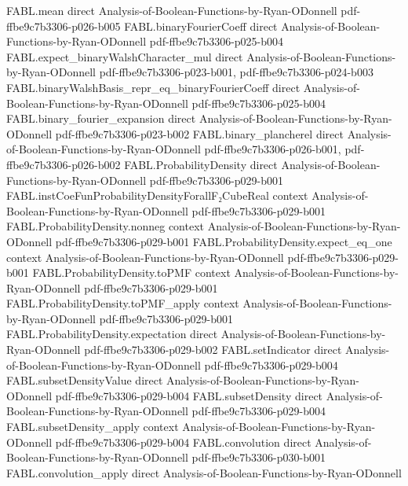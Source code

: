 \begin{theorem}
\proofstep
  {FABL.mean}
  {direct}
  {Analysis-of-Boolean-Functions-by-Ryan-ODonnell}
  {pdf-ffbe9c7b3306-p026-b005}
\proofstep
  {FABL.binaryFourierCoeff}
  {direct}
  {Analysis-of-Boolean-Functions-by-Ryan-ODonnell}
  {pdf-ffbe9c7b3306-p025-b004}
\proofstep
  {FABL.expect_binaryWalshCharacter_mul}
  {direct}
  {Analysis-of-Boolean-Functions-by-Ryan-ODonnell}
  {pdf-ffbe9c7b3306-p023-b001,
    pdf-ffbe9c7b3306-p024-b003}
\proofstep
  {FABL.binaryWalshBasis_repr_eq_binaryFourierCoeff}
  {direct}
  {Analysis-of-Boolean-Functions-by-Ryan-ODonnell}
  {pdf-ffbe9c7b3306-p025-b004}
\proofstep
  {FABL.binary_fourier_expansion}
  {direct}
  {Analysis-of-Boolean-Functions-by-Ryan-ODonnell}
  {pdf-ffbe9c7b3306-p023-b002}
\proofstep
  {FABL.binary_plancherel}
  {direct}
  {Analysis-of-Boolean-Functions-by-Ryan-ODonnell}
  {pdf-ffbe9c7b3306-p026-b001,
    pdf-ffbe9c7b3306-p026-b002}
\proofstep
  {FABL.ProbabilityDensity}
  {direct}
  {Analysis-of-Boolean-Functions-by-Ryan-ODonnell}
  {pdf-ffbe9c7b3306-p029-b001}
\proofstep
  {FABL.instCoeFunProbabilityDensityForallF₂CubeReal}
  {context}
  {Analysis-of-Boolean-Functions-by-Ryan-ODonnell}
  {pdf-ffbe9c7b3306-p029-b001}
\proofstep
  {FABL.ProbabilityDensity.nonneg}
  {context}
  {Analysis-of-Boolean-Functions-by-Ryan-ODonnell}
  {pdf-ffbe9c7b3306-p029-b001}
\proofstep
  {FABL.ProbabilityDensity.expect_eq_one}
  {context}
  {Analysis-of-Boolean-Functions-by-Ryan-ODonnell}
  {pdf-ffbe9c7b3306-p029-b001}
\proofstep
  {FABL.ProbabilityDensity.toPMF}
  {context}
  {Analysis-of-Boolean-Functions-by-Ryan-ODonnell}
  {pdf-ffbe9c7b3306-p029-b001}
\proofstep
  {FABL.ProbabilityDensity.toPMF_apply}
  {context}
  {Analysis-of-Boolean-Functions-by-Ryan-ODonnell}
  {pdf-ffbe9c7b3306-p029-b001}
\proofstep
  {FABL.ProbabilityDensity.expectation}
  {direct}
  {Analysis-of-Boolean-Functions-by-Ryan-ODonnell}
  {pdf-ffbe9c7b3306-p029-b002}
\proofstep
  {FABL.setIndicator}
  {direct}
  {Analysis-of-Boolean-Functions-by-Ryan-ODonnell}
  {pdf-ffbe9c7b3306-p029-b004}
\proofstep
  {FABL.subsetDensityValue}
  {direct}
  {Analysis-of-Boolean-Functions-by-Ryan-ODonnell}
  {pdf-ffbe9c7b3306-p029-b004}
\proofstep
  {FABL.subsetDensity}
  {direct}
  {Analysis-of-Boolean-Functions-by-Ryan-ODonnell}
  {pdf-ffbe9c7b3306-p029-b004}
\proofstep
  {FABL.subsetDensity_apply}
  {context}
  {Analysis-of-Boolean-Functions-by-Ryan-ODonnell}
  {pdf-ffbe9c7b3306-p029-b004}
\proofstep
  {FABL.convolution}
  {direct}
  {Analysis-of-Boolean-Functions-by-Ryan-ODonnell}
  {pdf-ffbe9c7b3306-p030-b001}
\proofstep
  {FABL.convolution_apply}
  {direct}
  {Analysis-of-Boolean-Functions-by-Ryan-ODonnell}

\end{theorem}
